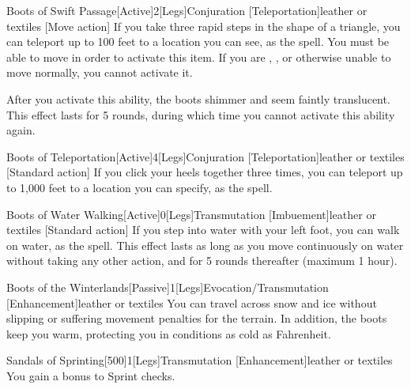         \begin{magicitemdef}{Boots of Swift Passage}[Active]{2}[Legs]{Conjuration [Teleportation]}{leather or textiles}
            [Move action] If you take three rapid steps in the shape of a triangle, you can teleport up to 100 feet to a location you can see, as the  spell.
            You must be able to move in order to activate this item.
            If you are \grappled, \immobilized, or otherwise unable to move normally, you cannot activate it.

            After you activate this ability, the boots shimmer and seem faintly translucent.
            This effect lasts for 5 rounds, during which time you cannot activate this ability again.
        \end{magicitemdef}

        \begin{magicitemdef}{Boots of Teleportation}[Active]{4}[Legs]{Conjuration [Teleportation]}{leather or textiles}
            [Standard action] If you click your heels together three times, you can teleport up to 1,000 feet to a location you can specify, as the  spell.
        \end{magicitemdef}

        \begin{magicitemdef}{Boots of Water Walking}[Active]{0}[Legs]{Transmutation [Imbuement]}{leather or textiles}
            [Standard action] If you step into water with your left foot, you can walk on water, as the  spell.
            This effect lasts as long as you move continuously on water without taking any other action, and for 5 rounds thereafter (maximum 1 hour).
        \end{magicitemdef}

        \begin{magicitemdef}{Boots of the Winterlands}[Passive]{1}[Legs]{Evocation/Transmutation [Enhancement]}{leather or textiles}
             You can travel across snow and ice without slipping or suffering movement penalties for the terrain.
            In addition, the boots keep you warm, protecting you in conditions as cold as  Fahrenheit.
        \end{magicitemdef}

        \begin{magicitemdef}{Sandals of Sprinting}[500]{1}[Legs]{Transmutation [Enhancement]}{leather or textiles}
             You gain a  bonus to Sprint checks.
        \end{magicitemdef}

